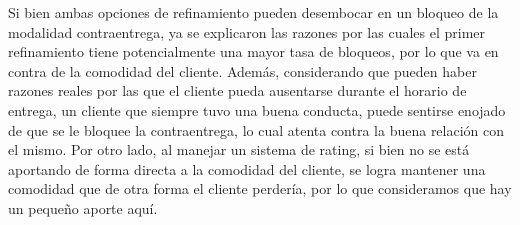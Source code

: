 Si bien ambas opciones de refinamiento pueden desembocar en un bloqueo de la
modalidad contraentrega, ya se explicaron las razones por las cuales el primer
refinamiento tiene potencialmente una mayor tasa de bloqueos, por lo que va en
contra de la comodidad del cliente. Además, considerando que pueden haber
razones reales por las que el cliente pueda ausentarse durante el horario de
entrega, un cliente que siempre tuvo una buena conducta, puede sentirse
enojado de que se le bloquee la contraentrega, lo cual atenta contra la buena
relación con el mismo. Por otro lado, al manejar un sistema de rating, si bien
no se está aportando de forma directa a la comodidad del cliente, se logra
mantener una comodidad que de otra forma el cliente perdería, por lo que
consideramos que hay un pequeño aporte aquí.
